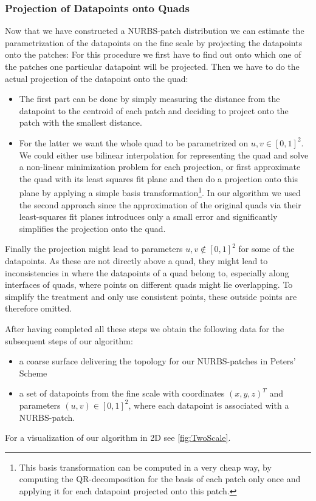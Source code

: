 \subsubsection{Projection of Datapoints onto Quads}
Now that we have constructed a \ac{NURBS}-patch distribution we can estimate the parametrization of the datapoints on the fine scale by projecting the datapoints onto the patches: For this procedure we first have to find out onto which one of the patches one particular datapoint will be projected. Then we have to do the actual projection of the datapoint onto the quad: 
\begin{itemize}
\item The first part can be done by simply measuring the distance from the datapoint to the centroid of each patch and deciding to project onto the patch with the smallest distance. 

\item For the latter we want the whole \ac{quad} to be parametrized on $u,v\in\left[0,1\right]^2$. We could either use bilinear interpolation for representing the quad and solve a non-linear minimization problem for each projection, or first approximate the quad with its least squares fit plane and then do a projection onto this plane by applying a simple basis transformation\footnote{This basis transformation can be computed in a very cheap way, by computing the QR-decomposition for the basis of each patch only once and applying it for each datapoint projected onto this patch.}. In our algorithm we used the second approach since the approximation of the original \acp{quad} via their least-squares fit planes introduces only a small error and significantly simplifies the projection onto the \ac{quad}.
\end{itemize}
Finally the projection might lead to parameters $u,v\not\in\left[0,1\right]^2$ for some of the datapoints. As these are not directly above a \ac{quad}, they might lead to inconsistencies in where the datapoints of a quad belong to, especially along interfaces of quads, where points on different quads might lie overlapping. To simplify the treatment and only use consistent points, these outside points are therefore omitted.

After having completed all these steps we obtain the following data for the subsequent steps of our algorithm:
\begin{itemize}
\item a coarse surface delivering the topology for our \ac{NURBS}-patches in Peters' Scheme
\item a set of datapoints from the fine scale with coordinates $\left(x,y,z\right)^T$ and parameters $\left(u,v\right)\in\left[0,1\right]^2$, where each datapoint is associated with a \ac{NURBS}-patch. 
\end{itemize}
For a visualization of our algorithm in 2D see \autoref{fig:TwoScale}.


